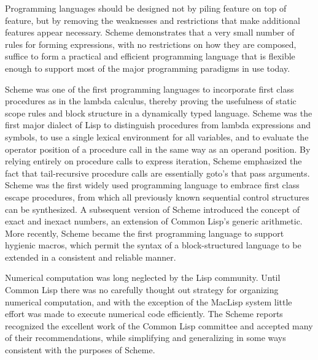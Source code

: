 
\label{historysection}

Programming languages should be designed not by piling feature on top of
feature, but by removing the weaknesses and restrictions that make additional
features appear necessary.  Scheme demonstrates that a very small number
of rules for forming expressions, with no restrictions on how they are
composed, suffice to form a practical and efficient programming language
that is flexible enough to support most of the major programming
paradigms in use today.

Scheme
was one of the first programming languages to incorporate first class
procedures as in the lambda calculus, thereby proving the usefulness of
static scope rules and block structure in a dynamically typed language.
Scheme was the first major dialect of Lisp to distinguish procedures
from lambda expressions and symbols, to use a single lexical
environment for all variables, and to evaluate the operator position
of a procedure call in the same way as an operand position.  By relying
entirely on procedure calls to express iteration, Scheme emphasized the
fact that tail-recursive procedure calls are essentially goto's that
pass arguments.  Scheme was the first widely used programming language to
embrace first class escape procedures, from which all previously known
sequential control structures can be synthesized.  A subsequent
version of Scheme introduced the concept of exact and inexact numbers,
an extension of Common Lisp's generic arithmetic.
More recently, Scheme became the first programming language to support
hygienic macros, which permit the syntax of a block-structured language
to be extended in a consistent and reliable manner.

Numerical computation was long neglected by the Lisp
community.  Until Common Lisp there was no carefully thought out
strategy for organizing numerical computation, and with the exception of
the MacLisp system \cite{Pitman83} little effort was made to
execute numerical code efficiently.
The Scheme reports recognized the excellent work
of the Common Lisp committee and accepted many of their recommendations,
while simplifying and generalizing in some ways
consistent with the purposes of Scheme.

